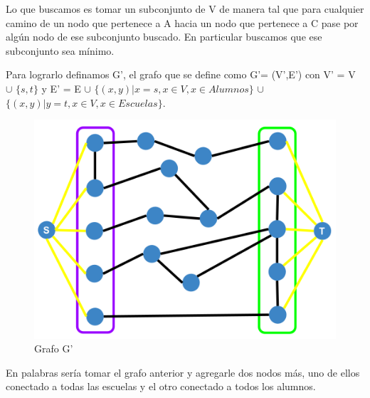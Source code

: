 Lo que buscamos es tomar un subconjunto de V de manera tal que para cualquier camino de un nodo que pertenece a A hacia un nodo que pertenece a C pase por algún nodo de ese subconjunto buscado. En particular buscamos que ese subconjunto sea mínimo.

Para lograrlo definamos G', el grafo que se define como G'= (V',E') con V' = V $\cup$ $\{s,t\}$ y E' = E $\cup$ $\{(x,y)| x = s, x \in V , x \in Alumnos \}$ $\cup$ $\{(x,y)| y = t, x \in V , x \in Escuelas \}$.

\begin{figure}[h!]
  \centering
    \includegraphics[scale = 0.225]{img/gprima.png}
    \caption{Grafo G'}
\end{figure}

En palabras sería tomar el grafo anterior y agregarle dos nodos más, uno de ellos conectado a todas las escuelas y el otro conectado a todos los alumnos.


